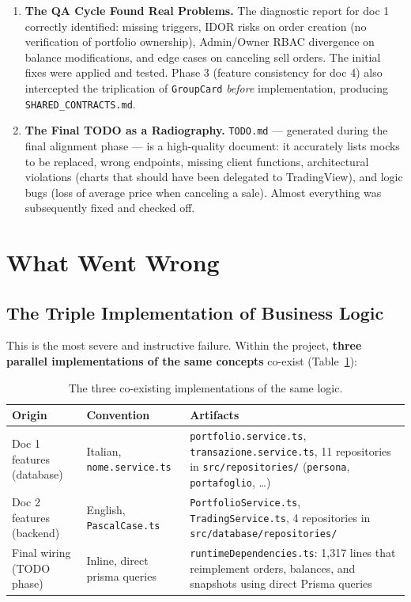 \documentclass[11pt,a4paper]{article}
\newcommand{\file}[1]{\texttt{\small #1}}
\begin{document}
\begin{enumerate}[leftmargin=1.8em]
		\item \textbf{The QA Cycle Found Real Problems.} The diagnostic report for doc 1 correctly identified: missing triggers, IDOR risks on order creation (no verification of portfolio ownership), Admin/Owner RBAC divergence on balance modifications, and edge cases on canceling sell orders. The initial fixes were applied and tested. Phase 3 (feature consistency for doc 4) also intercepted the triplication of \file{GroupCard} \emph{before} implementation, producing \file{SHARED\_CONTRACTS.md}.
		
		\item \textbf{The Final TODO as a Radiography.} \file{TODO.md} --- generated during the final alignment phase --- is a high-quality document: it accurately lists mocks to be replaced, wrong endpoints, missing client functions, architectural violations (charts that should have been delegated to TradingView), and logic bugs (loss of average price when canceling a sale). Almost everything was subsequently fixed and checked off.
	\end{enumerate}
	
	\section{What Went Wrong}
	
	\subsection{The Triple Implementation of Business Logic}
	\label{sec:tripla}
	
	This is the most severe and instructive failure. Within the project, \textbf{three parallel implementations of the same concepts} co-exist (Table~\ref{tab:tripla}):
	
	\begin{table}[h!]
		\centering
		\small
		\begin{tabular}{p{4.1cm}p{4.6cm}p{5.2cm}}
			\toprule
			\textbf{Origin} & \textbf{Convention} & \textbf{Artifacts} \\
			\midrule
			Doc 1 features (database) & Italian, \file{nome.service.ts} & \file{portfolio.service.ts}, \file{transazione.service.ts}, 11 repositories in \file{src/repositories/} (\file{persona}, \file{portafoglio}, \dots) \\
			\addlinespace
			Doc 2 features (backend) & English, \file{PascalCase.ts} & \file{PortfolioService.ts}, \file{TradingService.ts}, 4 repositories in \file{src/database/repositories/} \\
			\addlinespace
			Final wiring (TODO phase) & Inline, direct prisma queries & \file{runtimeDependencies.ts}: 1,317 lines that reimplement orders, balances, and snapshots using direct Prisma queries \\
			\bottomrule
		\end{tabular}
		\caption{The three co-existing implementations of the same logic.}
		\label{tab:tripla}
	\end{table}
	
\end{document}
